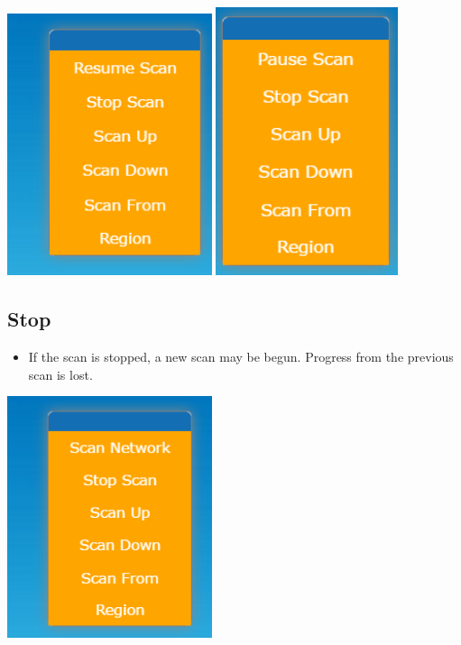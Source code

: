 \documentclass[hidelinks,a4paper,12pt]{article}
\begin{document}
	\begin{center}
		\includegraphics[width=0.45\textwidth]{./images/AfterPause.png}
		\includegraphics[width=0.4\textwidth]{./images/WhileActive.png}
	\end{center}	
	
	\newpage
	
		\subsection{Stop}
		\begin {itemize}
		\item If the scan is stopped, a new scan may be begun. Progress from the previous scan is lost.
	\end{itemize}
	
	\begin{center}
		\includegraphics[width=0.45\textwidth]{./images/AfterStop.png}
	\end{center}	
\end{document}
